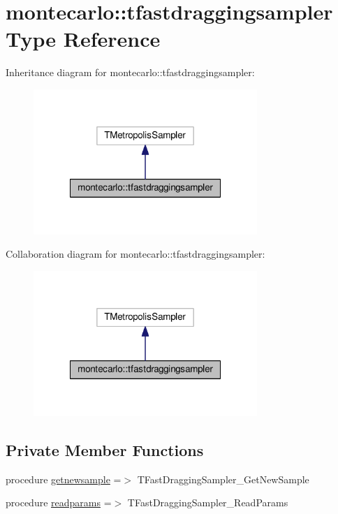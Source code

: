 \hypertarget{structmontecarlo_1_1tfastdraggingsampler}{}\section{montecarlo\+:\+:tfastdraggingsampler Type Reference}
\label{structmontecarlo_1_1tfastdraggingsampler}


Inheritance diagram for montecarlo\+:\+:tfastdraggingsampler\+:
\nopagebreak
\begin{figure}[H]
\begin{center}
\leavevmode
\includegraphics[width=240pt]{structmontecarlo_1_1tfastdraggingsampler__inherit__graph}
\end{center}
\end{figure}


Collaboration diagram for montecarlo\+:\+:tfastdraggingsampler\+:
\nopagebreak
\begin{figure}[H]
\begin{center}
\leavevmode
\includegraphics[width=240pt]{structmontecarlo_1_1tfastdraggingsampler__coll__graph}
\end{center}
\end{figure}
\subsection*{Private Member Functions}
\begin{DoxyCompactItemize}
\item 
procedure \mbox{\hyperlink{structmontecarlo_1_1tfastdraggingsampler_af3a4edaea5bd7b6b4b2f1b472d9d1eec}{getnewsample}} =$>$ T\+Fast\+Dragging\+Sampler\+\_\+\+Get\+New\+Sample
\item 
procedure \mbox{\hyperlink{structmontecarlo_1_1tfastdraggingsampler_a75b2ef6b8f1e23e2162009f8808401f2}{readparams}} =$>$ T\+Fast\+Dragging\+Sampler\+\_\+\+Read\+Params
\end{DoxyCompactItemize}
